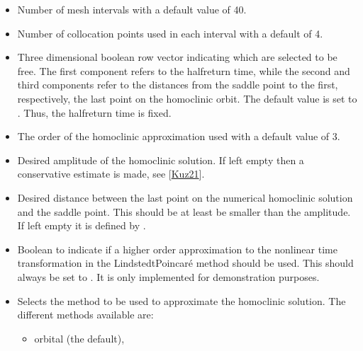 \documentclass[letterpaper,10pt,english]{jupyterBook}
\begin{document}
\begin{itemize}
\item {} 
\sphinxAtStartPar
{} Number of mesh intervals with a default value of 40.

\item {} 
\sphinxAtStartPar
{} Number of collocation points used in each interval with a default of 4.

\item {} 
\sphinxAtStartPar
{} Three dimensional boolean row vector indicating which  are selected to be free. The first component refers to the
half\sphinxhyphen{}return time, while the second and third components refer to the
distances from the saddle point to the first, respectively, the last point on
the homoclinic orbit. The default value is set to \sphinxcode{\sphinxupquote{{[}0 1 1{]}}}. Thus, the
half\sphinxhyphen{}return time  is fixed.

\item {} 
\sphinxAtStartPar
{} The order of the homoclinic approximation used with a default value
of 3.

\item {} 
\sphinxAtStartPar
{} Desired amplitude of the homoclinic solution. If left empty then
a conservative estimate is made, see {[}\hyperlink{cite.references:id3}{Kuz21}{]}.

\item {} 
\sphinxAtStartPar
{} Desired distance between the last point on the numerical
homoclinic solution and the saddle point. This should be at least be smaller
than the amplitude. If left empty it is defined by .

\item {} 
\sphinxAtStartPar
{} Boolean to indicate if a higher order
approximation to the nonlinear time transformation in the Lindstedt\sphinxhyphen{}Poincaré
method should be used. This should always be set to .  It is only
implemented for demonstration purposes.

\item {} 
\sphinxAtStartPar
{} Selects the method to be used to approximate the homoclinic
solution. The different methods available are:
\begin{itemize}
\item {} 
\sphinxAtStartPar
orbital (the default),


\end{itemize}
\end{itemize}
\end{document}
